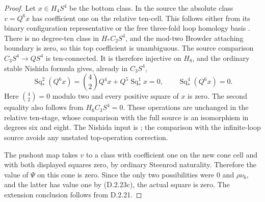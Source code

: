 \begin{proof}
Let $x\in H_4S^4$ be the bottom class. In the source the
absolute class $v=Q^6x$ has coefficient one on the relative
ten-cell. This follows either from its binary configuration
representative or the free three-fold loop homology basis
\cite[Chapter III, Theorems 3.1--3.2]{I_CohenLadaMay1976}.
There is no degree-ten class in $H_*C_2S^4$, and the mod-two
Browder attaching boundary is zero, so this top coefficient
is unambiguous. The source comparison $C_3S^4\to QS^4$ is
ten-connected. It is therefore injective on $H_8$, and the
ordinary stable Nishida formula gives, already in $C_3S^4$,
\[
 \operatorname{Sq}_*^2(Q^6x)
 =\binom42 Q^4x+Q^5\operatorname{Sq}_*^1x=0,
 \qquad \operatorname{Sq}_*^4(Q^6x)=0.
 \tag{D.2.23e}
\]
Here $\binom42=0$ modulo two and every positive square of
$x$ is zero. The second equality also follows from $H_6C_3S^4=0$.
These operations are unchanged in the relative ten-stage,
whose comparison with the full source is an isomorphism
in degrees six and eight. The Nishida input is
\cite[Chapter III, Theorem 1.3]{I_CohenLadaMay1976}; the
comparison with the infinite-loop source avoids any
unstated top-operation correction.

The pushout map takes $v$ to a class with coefficient one
on the new cone cell and with both displayed squares zero,
by ordinary Steenrod naturality. Therefore the value of
$\Psi$ on this cone is zero. Since the only two possibilities
were $0$ and $\rho\nu_6$, and the latter has value one by
\textup{(D.2.23c)}, the actual square is zero. The extension
conclusion follows from \textup{D.2.21}.
\end{proof}

